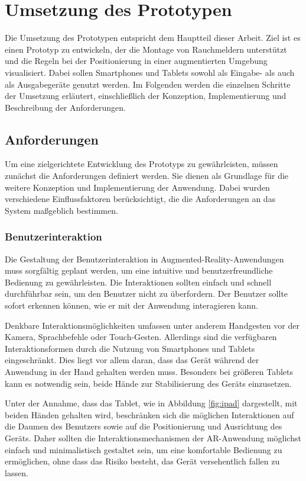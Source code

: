 \chapter{Umsetzung des Prototypen}

Die Umsetzung des Prototypen entspricht dem Hauptteil dieser Arbeit. Ziel ist es einen Prototyp zu entwickeln, der die Montage von Rauchmeldern unterstützt und die Regeln bei der Positionierung in einer augmentierten Umgebung visualisiert. Dabei sollen Smartphones und Tablets sowohl als Eingabe- als auch als Ausgabegeräte genutzt werden. Im Folgenden werden die einzelnen Schritte der Umsetzung erläutert, einschließlich der Konzeption, Implementierung und Beschreibung der Anforderungen.

\section{Anforderungen}\label{sec:requirements}

Um eine zielgerichtete Entwicklung des Prototyps zu gewährleisten, müssen zunächst die Anforderungen definiert werden. Sie dienen als Grundlage für die weitere Konzeption und Implementierung der Anwendung. Dabei wurden verschiedene Einflussfaktoren berücksichtigt, die die Anforderungen an das System maßgeblich bestimmen.

\subsection{Benutzerinteraktion}

Die Gestaltung der Benutzerinteraktion in Augmented-Reality-Anwendungen muss sorgfältig geplant werden, um eine intuitive und benutzerfreundliche Bedienung zu gewährleisten. Die Interaktionen sollten einfach und schnell durchführbar sein, um den Benutzer nicht zu überfordern. Der Benutzer sollte sofort erkennen können, wie er mit der Anwendung interagieren kann. 

Denkbare Interaktionsmöglichkeiten umfassen unter anderem Handgesten vor der Kamera, Sprachbefehle oder Touch-Gesten. Allerdings sind die verfügbaren Interaktionsformen durch die Nutzung von Smartphones und Tablets eingeschränkt. Dies liegt vor allem daran, dass das Gerät während der Anwendung in der Hand gehalten werden muss. Besonders bei größeren Tablets kann es notwendig sein, beide Hände zur Stabilisierung des Geräts einzusetzen.

Unter der Annahme, dass das Tablet, wie in Abbildung \ref{fig:ipad} dargestellt, mit beiden Händen gehalten wird, beschränken sich die möglichen Interaktionen auf die Daumen des Benutzers sowie auf die Positionierung und Ausrichtung des Geräts. Daher sollten die Interaktionsmechanismen der AR-Anwendung möglichst einfach und minimalistisch gestaltet sein, um eine komfortable Bedienung zu ermöglichen, ohne dass das Risiko besteht, das Gerät versehentlich fallen zu lassen.

